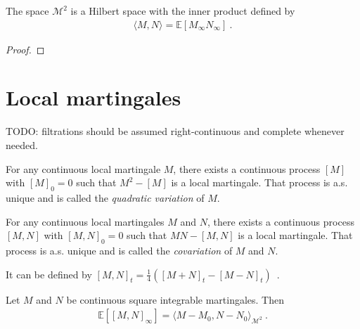\begin{theorem}\label{thm:hilbertSpace_squareIntegrableMartingales}
The space $\mathcal{M}^2$ is a Hilbert space with the inner product defined by
\begin{align*}
  \langle M, N \rangle = \mathbb{E}[M_\infty N_\infty]
  \: .
\end{align*}
\end{theorem}

\begin{proof}

\end{proof}


\section{Local martingales}

TODO: filtrations should be assumed right-continuous and complete whenever needed.


\begin{definition}\label{def:quadraticVariation}
For any continuous local martingale $M$, there exists a continuous process $[M]$ with $[M]_0 = 0$ such that $M^2 - [M]$ is a local martingale. That process is a.s. unique and is called the \emph{quadratic variation} of $M$.
\end{definition}


\begin{definition}[Covariation]\label{def:covariation}
For any continuous local martingales $M$ and $N$, there exists a continuous process $[M,N]$ with $[M,N]_0 = 0$ such that $MN - [M,N]$ is a local martingale. That process is a.s. unique and is called the \emph{covariation} of $M$ and $N$.

It can be defined by $[M, N]_t = \frac{1}{4}\left([M+N]_t - [M-N]_t \right)$~.
\end{definition}


\begin{lemma}\label{lem:covariation_eq_inner}
Let $M$ and $N$ be continuous square integrable martingales. Then
\begin{align*}
  \mathbb{E}\left[[M,N]_\infty\right] = \langle M - M_0, N - N_0 \rangle_{\mathcal{M}^2}
  \: .
\end{align*}
\end{lemma}


